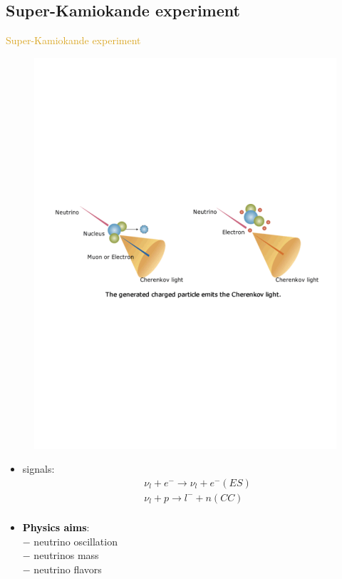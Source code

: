 \documentclass[11pt]{beamer} %
\renewcommand{\(}{\begin{columns}}
\renewcommand{\)}{\end{columns}}
\newcommand{\<}[1]{\begin{column}{#1}}
\renewcommand{\>}{\end{column}}
\newcommand{\itt}{\begin{itemize}}
\newcommand{\tti}{\end{itemize}}
\newcommand{\hlt}[2]{\textcolor{#1}{\textbf{#2}}}
\begin{document}
\subsection{Super-Kamiokande experiment}
\begin{frame}{\textcolor{Goldenrod}{Super-Kamiokande experiment}}
    \begin{figure}[h]
      \centering
      \includegraphics[height=0.2\textheight]{./Images/SKK04.pdf}
    \end{figure}
    
    \itt
  \item signals:
    \[
      \begin{split}
        &\nu_{l} + e^- \to \nu_l + e^- (ES)\\
        &\nu_l + p \to l^-  + n  (CC)\\
      \end{split}
    \]
    
  \item \hlt{black}{Physics aims}:\\
    $-$ neutrino oscillation\\
    $-$ neutrinos mass\\
    $-$ neutrino flavors 
    \tti
\end{frame}
\end{document}

